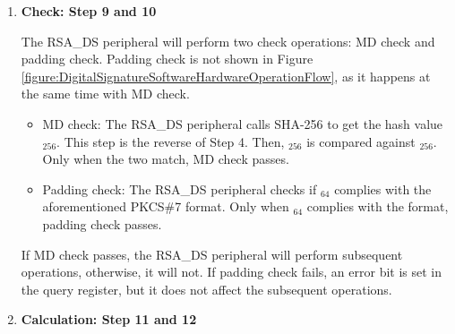 \documentclass[main\_\_EN.tex]{subfiles}
\begin{document}
\begin{enumerate}
    \item {\bfseries Check: Step 9 and 10}

        The RSA\_DS peripheral will perform two check operations: MD check and padding check. Padding check is not shown in Figure  \ref{figure:DigitalSignatureSoftwareHardwareOperationFlow}, as it happens at the same time with MD check.


        \begin{itemize}

            \item MD check: The RSA\_DS peripheral calls SHA-256 to get the hash value \begin{math}[CALC\_MD]_{256}\end{math}. This step is the reverse of Step 4. Then,  \begin{math}[CALC\_MD]_{256}\end{math} is compared against  \begin{math}[MD]_{256}\end{math}. Only when the two match, MD check passes.
            \item Padding check: The RSA\_DS peripheral checks if \begin{math}[\beta]_{64} \end{math} complies with the aforementioned PKCS\#7 format. Only when \begin{math}[\beta]_{64} \end{math} complies with the format, padding check passes.

        \end{itemize}

        If MD check passes, the RSA\_DS peripheral will perform subsequent operations, otherwise, it will not. If padding check fails, an error bit is set in the query register, but it does not affect the subsequent operations.

    \item {\bfseries Calculation: Step 11 and 12}


\end{enumerate}
\end{document}
